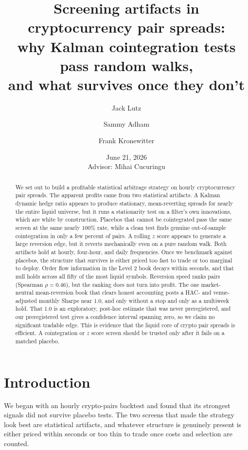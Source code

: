\documentclass[11pt]{article}
\title{Screening artifacts in cryptocurrency pair spreads:\\
why Kalman cointegration tests pass random walks,\\
and what survives once they don't}
\author{Jack Lutz \and Sammy Adham \and Frank Kronewitter}
\date{June 21, 2026\\[0.4em]\small Advisor: Mihai Cucuringu}
\begin{document}
\maketitle

\begin{abstract}
We set out to build a profitable statistical arbitrage strategy on hourly cryptocurrency
pair spreads. The apparent profits came from two statistical artifacts. A
Kalman dynamic hedge ratio appears to produce stationary, mean-reverting spreads for nearly
the entire liquid universe, but it runs a stationarity test on a filter's own innovations,
which are white by construction. Placebos that cannot be cointegrated pass the same screen at
the same nearly $100\%$ rate, while a clean test finds genuine out-of-sample cointegration in
only a few percent of pairs. A rolling $z$ score appears to generate a large reversion edge,
but it reverts mechanically even on a pure random walk. Both artifacts hold at hourly,
four-hour, and daily frequencies. Once we benchmark against placebos, the structure that
survives is either priced too fast to trade or too marginal to deploy. Order flow information in
the Level 2 book decays within seconds, and that null holds across all fifty of the most liquid symbols. Reversion speed ranks pairs (Spearman $\rho = 0.46$), but
the ranking does not turn into profit. The one market-neutral mean-reversion book that clears
honest accounting posts a HAC- and venue-adjusted monthly Sharpe near $1.0$, and only without a
stop and only as a multiweek hold. That $1.0$ is an
exploratory, post-hoc estimate that was never preregistered, and our preregistered test gives a
confidence interval spanning zero, so we claim no significant tradable edge. This is evidence that
the liquid core of crypto pair spreads is efficient. A cointegration or $z$ score screen should be
trusted only after it fails on a matched placebo.
\end{abstract}

\section{Introduction}
\label{sec:intro}

We began with an hourly crypto-pairs backtest and found that its strongest signals did not
survive placebo tests. The two screens that made the strategy look best are statistical
artifacts, and whatever structure is genuinely present is either priced within seconds or too
thin to trade once costs and selection are counted.
\end{document}
